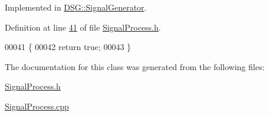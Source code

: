 Implemented in \hyperlink{class_d_s_g_1_1_signal_generator_ab878f70be78d7b61beb2c6787845457a}{D\+S\+G\+::\+Signal\+Generator}.



Definition at line \hyperlink{_signal_process_8h_source_l00041}{41} of file \hyperlink{_signal_process_8h_source}{Signal\+Process.\+h}.


\begin{DoxyCode}
00041                                                                                     \{
00042         \textcolor{keywordflow}{return} \textcolor{keyword}{true};
00043     \}
\end{DoxyCode}


The documentation for this class was generated from the following files\+:\begin{DoxyCompactItemize}
\item 
\hyperlink{_signal_process_8h}{Signal\+Process.\+h}\item 
\hyperlink{_signal_process_8cpp}{Signal\+Process.\+cpp}\end{DoxyCompactItemize}
